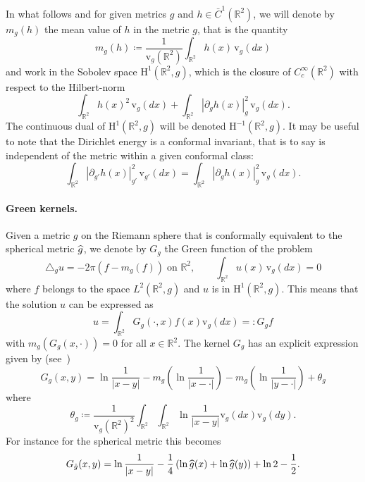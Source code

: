 \documentclass[10pt]{amsart}
\theoremstyle{definition}\newtheorem{defi}[theo]{Definition}\newtheorem{rema}[theo]{Remark}\newtheorem{exam}[theo]{Example}\newtheorem{exem}[theo]{Example}\newtheorem{nota}[theo]{Notation}
\newcommand{\rmv}{\mathrm{v}}
\newcommand{\rmH}{\mathrm{H}}
\newcommand{\R}{\mathbb{R}}
\newcommand{\norm}[1]{\left\lvert#1\right\rvert}
\let\oldhat\hat
\renewcommand*{\hat}[1]{\mathchoice{\widehat{#1}}{\widehat{#1}}{\oldhat{#1}}{\oldhat{#1}}}
\begin{document}
In what follows and for given metrics $g$ and $h\in \bar C^1(\R^2)$, we will denote by $m_{g}(h)$ the mean value of $h$ in the metric $g$, that is the quantity
\begin{equation}
m_{g}(h)\coloneqq \frac{1}{\rmv_g\left(\R^2\right)}\int_{\R^2}h(x)\,\rmv_g (dx)
\end{equation}
and work in the Sobolev space $\rmH^1(\R^2,g)$, which is the closure of $C^\infty_c(\R^2)$ with respect to the Hilbert-norm
\begin{equation}\label{Hnorm}
\int_{\R^2}h(x)^2\,\rmv_{g}(dx)+\int_{\R^2}\left|\partial_g h(x)\right|^2_g\,\rmv_g(dx).
\end{equation}
The continuous dual of $\rmH^1(\R^2,g)$ will be denoted $\rmH^{-1}(\R^2,g)$. It may be useful to note that the Dirichlet energy is a conformal invariant, that is to say is independent of the metric within a given conformal class:
\begin{equation}\label{diri}
\int_{\R^2}\left|\partial_{g'} h(x)\right|_{g'}^2\, \rmv_{g'}(dx)=\int_{\R^2}\left|\partial_{g} h(x)\right|_{g}^2\,\rmv_{g}(dx).
\end{equation}


\paragraph{Green kernels.} Given a metric $g$ on the Riemann sphere that is conformally equivalent to the spherical metric $\hat g$, we denote by $G_g$ the Green function of the problem
\begin{equation*}
\triangle_g u=-2\pi \left(f-m_g(f)\right) \;\text{on }\R^2,\qquad \int_{\R^2} u(x) \,\rmv_g(dx) =0
\end{equation*}
where $f$ belongs to the space $L^2(\R^2, g)$ and $u$ is in $ \rmH^1(\R^2,g)$. This means that the solution $u$ can be expressed as
\begin{equation}
u=\int_{\R^2} G_g(\cdot,x)f(x)\rmv_g(dx)=:G_gf
\end{equation}
with $m_g(G_g(x,\cdot))=0$ for all $x\in\R^2$. The kernel $G_g$ has an explicit expression given by (see~\cite[Equation~(2.9)]{DKRV})
\begin{equation}
G_g(x,y)=\ln\frac{1}{\norm{x-y}}-m_g\left(\ln\frac{1}{\norm{x-\cdot}}\right)-m_g\left(\ln\frac{1}{\norm{y-\cdot}}\right)+\theta_g
\end{equation}
where
\[
\theta_g\coloneqq \frac{1}{\rmv_g(\R^2)^2}\int_{\R^2}\int_{\R^2}\ln\frac{1}{\norm{x-y}}\rmv_g(dx)\rmv_g(dy).
\]
For instance for the spherical metric this becomes
\begin{equation}\label{Green_round}
G_{\hat g}(x,y)=\ln\frac{1}{\norm{x-y}}-\frac14\left(\ln\hat g(x)+\ln\hat g(y)\right)+\ln 2-\frac12.
\end{equation}
\end{document}

